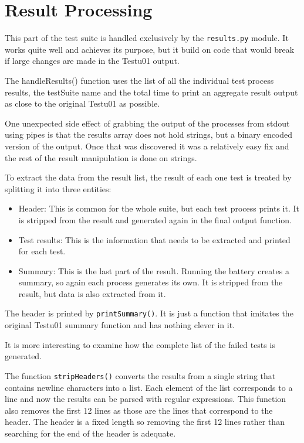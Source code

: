 \section{Result Processing}

This part of the test suite is handled exclusively by the \texttt{results.py} module. It works quite well and achieves its purpose, but it build on code that would break if large changes are made in the Testu01 output.

The handleResults() function uses the list of all the individual test process results, the testSuite name and the total time to print an aggregate result output as close to the original Testu01 as possible.

One unexpected side effect of grabbing the output of the processes from stdout using pipes is that the results array does not hold strings, but a binary encoded version of the output. Once that was discovered it was a relatively easy fix and the rest of the result manipulation is done on strings.

To extract the data from the result list, the result of each one test is treated by splitting it into three entities:
\begin{itemize}
  \item Header: This is common for the whole suite, but each test process prints it. It is stripped from the result and generated again in the final output function.
  \item Test results: This is the information that needs to be extracted and printed for each test. 
  \item Summary: This is the last part of the result. Running the battery creates a summary, so again each process generates its own. It is stripped from the result, but data is also extracted from it.
\end{itemize}

The header is printed by \texttt{printSummary()}. It is just a function that imitates the original Testu01 summary function and has nothing clever in it.

It is more interesting to examine how the complete list of the failed tests is generated.

The function \texttt{stripHeaders()} converts the results from a single string that contains newline characters into a list. Each element of the list corresponds to a line and now the results can be parsed with regular expressions. This function also removes the first 12 lines as those are the lines that correspond to the header. The header is a fixed length so removing the first 12 lines rather than searching for the end of the header is adequate.


